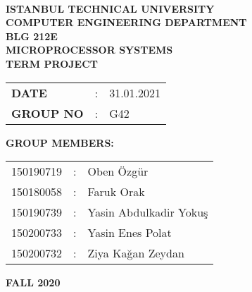\documentclass[pdftex,12pt,a4paper]{article}
\begin{document}
\begin{titlepage}
\begin{center}
\textbf{}\\
\textbf{\Large{ISTANBUL TECHNICAL UNIVERSITY}}\\
\vspace{0.5cm}
\textbf{\Large{COMPUTER ENGINEERING DEPARTMENT}}\\
\vspace{2cm}
\textbf{\Large{BLG 212E\\ MICROPROCESSOR SYSTEMS\\ TERM PROJECT}}\\
\vspace{2.8cm}
\begin{table}[ht]
\centering
\Large{
\begin{tabular}{lcl}
\textbf{DATE}  & : & 31.01.2021 \\
\textbf{GROUP NO}  & : & G42 \\
\end{tabular}}
\end{table}
\vspace{1cm}
\textbf{\Large{GROUP MEMBERS:}}\\
\begin{table}[ht]
\centering
\Large{
\begin{tabular}{rcl}
150190719  & : & Oben Özgür \\
150180058  & : & Faruk Orak \\
150190739  & : & Yasin Abdulkadir Yokuş \\
150200733  & : & Yasin Enes Polat \\
150200732  & : & Ziya Kağan Zeydan \\
\end{tabular}}
\end{table}
\vspace{2.8cm}
\textbf{\Large{FALL 2020}}

\end{center}

\end{titlepage}

\thispagestyle{empty}
\setcounter{tocdepth}{4}
\tableofcontents
\clearpage

\setcounter{page}{1}
\end{document}

